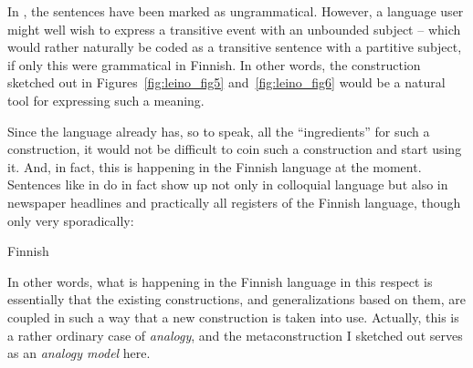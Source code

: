 \documentclass[output=paper, colorlinks,citecolor=brown]{langsci/langscibook}
\begin{document}
In , the sentences have been marked as ungrammatical. However, a language user might well wish to express a transitive event with an unbounded subject -- which would rather naturally be coded as a transitive sentence with a partitive subject, if only this were grammatical in Finnish. In other words, the construction sketched out in Figures~\ref{fig:leino_fig5} and~\ref{fig:leino_fig6} would be a natural tool for expressing such a meaning.

Since the language already has, so to speak, all the “ingredients” for such a construction, it would not be difficult to coin such a construction and start using it. And, in fact, this is happening in the Finnish language at the moment. Sentences like in  do in fact show up not only in colloquial language but also in newspaper headlines and practically all registers of the Finnish language, though only very sporadically:

\ea\label{ex:leino_7a}
{Finnish}\\

\z\z

In other words, what is happening in the Finnish language in this respect is essentially that the existing constructions, and generalizations based on them, are coupled in such a way that a new construction is taken into use. Actually, this is a rather ordinary case of \textit{analogy}, and the metaconstruction I sketched out serves as an \textit{analogy model} here.\largerpage
\end{document}
